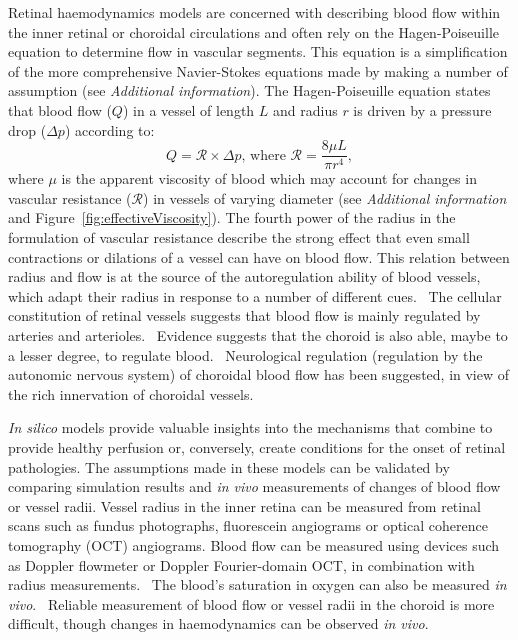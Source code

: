 \documentclass{article}
\begin{document}
Retinal haemodynamics models are concerned with describing blood flow within the inner retinal or choroidal circulations and often rely on the Hagen-Poiseuille equation to determine flow in vascular segments.
This equation is a simplification of the more comprehensive Navier-Stokes equations made by making a number of assumption (see \textit{Additional information}).
The Hagen-Poiseuille equation states that blood flow ($Q$) in a vessel of length $L$ and radius $r$ is driven by a pressure drop ($\Delta p$) according to:
\begin{equation*}
  \label{eq:Hagen-Poiseuille}
  Q = \mathcal R\times\Delta p \mbox{, where } \mathcal{R} = \frac{8\mu L}{\pi r^4},
\end{equation*}
where $\mu$ is the apparent viscosity of blood which may account for changes in vascular resistance ($\mathcal R$) in vessels of varying diameter (see \textit{Additional information} and Figure~\ref{fig:effectiveViscosity}).
The fourth power of the radius in the formulation of vascular resistance describe the strong effect that even small contractions or dilations of a vessel can have on blood flow.
This relation between radius and flow is at the source of the autoregulation ability of blood vessels, which adapt their radius in response to a number of different cues.~\cite{Kur_2012}
The cellular constitution of retinal vessels suggests that blood flow is mainly regulated by arteries and arterioles.~\cite{An_2020,Kur_2012}
Evidence suggests that the choroid is also able, maybe to a lesser degree, to regulate blood.~\cite{Polska_2007,Riva_1997}
Neurological regulation (regulation by the autonomic nervous system) of choroidal blood flow has been suggested, in view of the rich innervation of choroidal vessels.~\cite{BeharCohen_2020,Polska_2007}

\textit{In silico} models provide valuable insights into the mechanisms that combine to provide healthy perfusion or, conversely, create conditions for the onset of retinal pathologies.
The assumptions made in these models can be validated by comparing simulation results and \textit{in vivo} measurements of changes of blood flow or vessel radii.
Vessel radius in the inner retina can be measured from retinal scans such as fundus photographs, fluorescein angiograms or optical coherence tomography (OCT) angiograms.
Blood flow can be measured using devices such as Doppler flowmeter or Doppler Fourier-domain OCT, in combination with radius measurements.~\cite{DoblhoffDier_2014,Wang_2009}
The blood's saturation in oxygen can also be measured \textit{in vivo}.~\cite{Geirsdottir_2013}
Reliable measurement of blood flow or vessel radii in the choroid is more difficult, though changes in haemodynamics can be observed \textit{in vivo}.~\cite{Riva_1997,Scherm_2019}
\end{document}
